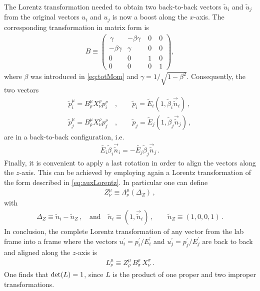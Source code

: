 \documentclass[11pt,a4paper]{article}
\begin{document}
The Lorentz transformation needed to obtain two  back-to-back vectors $\tilde{u}_i$ and $\tilde{u}_j$ from the original vectors $u_i$ and $u_j$ is now a boost along the $x$-axis.
The corresponding transformation in matrix form is
\begin{align} \label{eq:matB}
B \equiv  \left(
\begin{array}{cccc}
\, \gamma &   -\beta \gamma &  \;0 & \;0\\
-\beta \gamma & \gamma & \;0  & \;0  \\
0 &0  &  \;1 &  \;0 \\
0& 0& \;0 & \;1
\end{array}
\right),
\end{align}
where $\beta$ was introduced in \eqref{eq:totMom} and $\gamma=1/\sqrt{1-\beta^2}$. 
Consequently,  the two vectors
\begin{align}
\tilde{p}_i^{\mu} = B^\mu_\rho X^\rho_\nu p_i^\nu & \,, \qquad \tilde{p}_i=\tilde{E}_i(1,\tilde{\beta}_i\vec{\tilde{n}}_i) \, ,
\nonumber \\
\tilde{p}_j^{\mu}=B^\mu_\rho X^\rho_\nu p_j^\nu 
& \, , \qquad
\tilde{p}_j=\tilde{E}_j(1,\tilde{\beta}_j\vec{\tilde{n}}_j) \, ,
\end{align}
are in a back-to-back configuration, i.e. 
\begin{align}
\tilde{E_i} \tilde{\beta}_i \vec{\tilde{n}}_i = 
-\tilde{E_j} \tilde{\beta}_j \vec{\tilde{n}}_j \, . 
\end{align}
Finally, it is convenient to apply a last rotation in order to align the vectors along the $z$-axis. This can be achieved by employing again a Lorentz transformation of the form described in \eqref{eq:auxLorentz}. In particular one can define 
\begin{align} \label{eq:matZ}
	Z_\nu^\mu \equiv \Lambda_\nu^\mu\left(\Delta_Z\right) \, ,
\end{align}
with
\begin{align}
\Delta_Z \equiv \tilde{n}_i  - \tilde{n}_Z \, , \quad \text{and} \quad 
 \tilde{n}_i \equiv (1,\vec{\tilde{n}}_i) \, , \qquad
 \tilde{n}_Z \equiv (1,0,0,1) \, .
\end{align}
In conclusion, the complete Lorentz transformation of any vector from the lab frame into a frame where  the vectors $u^\prime_i = p^\prime_i/E^\prime_i$  and $u^\prime_j = p^\prime_j/E^\prime_j$ are back to back and aligned along the $z$-axis is 
\begin{align}\label{eq:bstToBtB}
L_\nu^\mu \equiv Z_\rho^\mu\,B_\sigma^\rho\,X_\nu^\sigma \,.
\end{align}
One finds that ${\rm det}(L)=1$, since $L$ is the product of one proper and two improper transformations.
\end{document}
